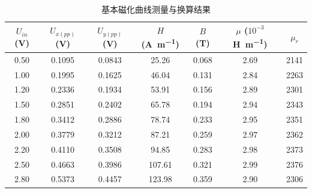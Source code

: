 \documentclass{../../templates/Report}%
\begin{document}
\begin{fullreportonly}
    \begin{table}[H]
        \centering
        \caption{基本磁化曲线测量与换算结果}
        \label{tab:basic_curve}
        \begin{tabular}{ccccccc} %
            \toprule
            $U_{in}$ (\unit{\volt}) & $U_{x(pp)}$ (\unit{\volt}) & $U_{y(pp)}$ (\unit{\volt}) & $H$ (\unit{\ampere\per\meter}) & $B$ (\unit{\tesla}) & $\mu$ ($10^{-3}$\unit{\henry\per\meter}) & $\mu_r$ \\
            \midrule
            0.50                    & 0.1095                     & 0.0843                     & 25.26                          & 0.068               & 2.69                                     & 2141    \\
            1.00                    & 0.1995                     & 0.1625                     & 46.04                          & 0.131               & 2.84                                     & 2263    \\
            1.20                    & 0.2336                     & 0.1934                     & 53.91                          & 0.156               & 2.89                                     & 2301    \\
            1.50                    & 0.2851                     & 0.2402                     & 65.78                          & 0.194               & 2.94                                     & 2343    \\
            1.80                    & 0.3412                     & 0.2886                     & 78.74                          & 0.233               & 2.95                                     & 2351    \\
            2.00                    & 0.3779                     & 0.3212                     & 87.21                          & 0.259               & 2.97                                     & 2362    \\
            2.20                    & 0.4110                     & 0.3508                     & 94.85                          & 0.283               & 2.98                                     & 2373    \\
            2.50                    & 0.4663                     & 0.3986                     & 107.61                         & 0.321               & 2.99                                     & 2376    \\
            2.80                    & 0.5373                     & 0.4457                     & 123.98                         & 0.359               & 2.90                                     & 2306    \\

\end{tabular}
\end{table}
\end{fullreportonly}
\end{document}
